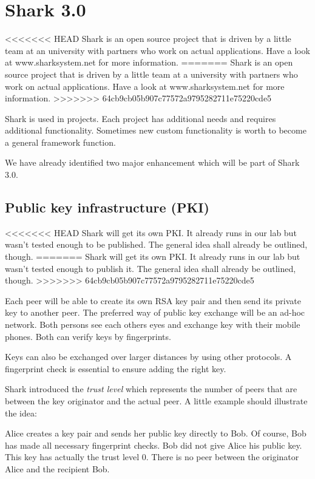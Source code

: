 \chapter{Shark 3.0}
<<<<<<< HEAD
Shark is an open source project that is driven by a little team at an university with partners who work on actual applications. Have a look at www.sharksystem.net for more information.
=======
Shark is an open source project that is driven by a little team at a university with partners who work on actual applications. Have a look at www.sharksystem.net for more information.
>>>>>>> 64cb9cb05b907c77572a9795282711e75220cde5

Shark is used in projects. Each project has additional needs and requires additional functionality. Sometimes new custom functionality is worth to become a general framework function.

We have already identified two major enhancement which will be part of Shark 3.0.


\section{Public key infrastructure (PKI)}
<<<<<<< HEAD
Shark will get its own PKI. It already runs in our lab but wasn't tested enough to be published. The general idea shall already be outlined, though.
=======
Shark will get its own PKI. It already runs in our lab but wasn't tested enough to publish it. The general idea shall already be outlined, though.
>>>>>>> 64cb9cb05b907c77572a9795282711e75220cde5

Each peer will be able to create its own RSA key pair and then send its private key to another peer. The preferred way of public key exchange will be an ad-hoc network. Both persons see each others eyes and exchange key with their mobile phones.
Both can verify keys by fingerprints.

Keys can also be exchanged over larger distances by using other protocols. A fingerprint check is essential to ensure adding the right key.

Shark introduced the {\it trust level} which represents the number of peers that are between the key originator and the actual peer. A little example should illustrate the idea:

Alice creates a key pair and sends her public key directly to Bob. Of course, Bob has made all necessary fingerprint checks. Bob did not give Alice his public key. This key has actually the trust level 0. There is no peer between the originator Alice and the recipient Bob.

